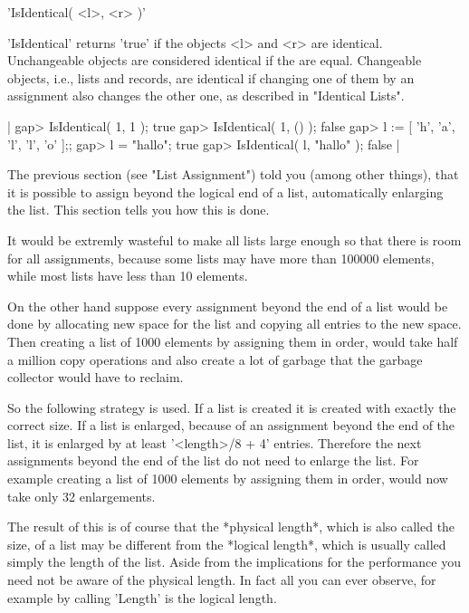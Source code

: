 
'IsIdentical( <l>, <r> )'

'IsIdentical'  returns 'true'  if the objects <l> and <r>  are identical.
Unchangeable  objects  are  considered   identical  if   the  are  equal.
Changeable  objects, i.e., lists  and  records, are identical if changing
one of them by  an assignment  also  changes the  other one, as described
in "Identical Lists".

|    gap> IsIdentical( 1, 1 );
    true
    gap> IsIdentical( 1, () );
    false
    gap> l := [ 'h', 'a', 'l', 'l', 'o' ];;
    gap> l = "hallo";
    true
    gap> IsIdentical( l, "hallo" );
    false |


The previous section  (see    "List Assignment") told you   (among  other
things), that it is possible to assign beyond the  logical end of a list,
automatically enlarging  the list.   This section  tells  you how this is
done.

It would be  extremly wasteful to  make all  lists large enough  so  that
there is room for all assignments, because some lists  may have more than
100000 elements, while most lists have less than 10 elements.

On the other hand suppose every assignment beyond the end of a list would
be done by allocating  new space for the list  and copying all entries to
the new space.  Then creating a  list of 1000  elements by assigning them
in order, would take half a million copy operations and also create a lot
of garbage that the garbage collector would have to reclaim.

So the  following strategy is used.   If a list is  created it is created
with exactly  the  correct size.  If a   list is enlarged,  because of an
assignment  beyond   the end of the  list,   it is enlarged   by at least
'<length>/8 + 4' entries.  Therefore the next  assignments beyond the end
of the list do not need to enlarge the list.  For example creating a list
of  1000 elements by   assigning them in order,   would now take  only 32
enlargements.

The result of this is of course that the *physical length*, which is also
called the size, of a  list may be different  from the *logical  length*,
which is usually called  simply the length of  the list.  Aside  from the
implications for  the performance you need not  be  aware of the physical
length.    In fact  all you can   ever  observe, for   example by calling
'Length' is the logical length.

